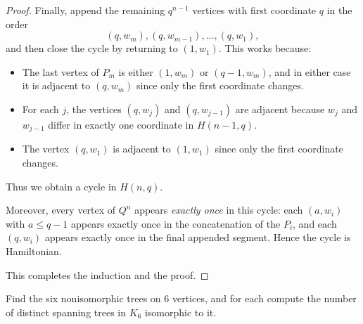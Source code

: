 \documentclass[11pt, a4paper]{ctexrep}
\begin{document}
\begin{proof}
    Finally, append the remaining $q^{n-1}$ vertices with first coordinate $q$
    in the order
    \[
        (q,w_m),(q,w_{m-1}),\dots,(q,w_1),
    \]
    and then close the cycle by returning to $(1,w_1)$.
    This works because:
    \begin{itemize}
        \item The last vertex of $P_m$ is either $(1,w_m)$ or $(q-1,w_m)$, and in either
              case it is adjacent to $(q,w_m)$ since only the first coordinate changes.
        \item For each $j$, the vertices $(q,w_j)$ and $(q,w_{j-1})$ are adjacent because
              $w_j$ and $w_{j-1}$ differ in exactly one coordinate in $H(n-1,q)$.
        \item The vertex $(q,w_1)$ is adjacent to $(1,w_1)$ since only the first coordinate changes.
    \end{itemize}
    Thus we obtain a cycle in $H(n,q)$.

    Moreover, every vertex of $Q^n$ appears \emph{exactly once} in this cycle:
    each $(a,w_i)$ with $a\le q-1$ appears exactly once in the concatenation of the
    $P_i$, and each $(q,w_i)$ appears exactly once in the final appended segment.
    Hence the cycle is Hamiltonian.

    This completes the induction and the proof.
\end{proof}

\begin{exercise}
    Find the six nonisomorphic trees on 6 vertices, and for each compute the number of distinct spanning trees in $K_6$ isomorphic to it.
\end{exercise}
\end{document}
